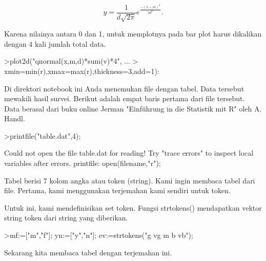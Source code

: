\documentclass{article}
\begin{document}
\begin{eulernotebook}
\begin{eulercomment}
\begin{eulercomment}
\begin{eulercomment}
\end{eulercomment}
\begin{eulerformula}
\[
y=\frac{1}{d\sqrt{2\pi}}e^{\frac{-(x-m)^2}{2d^2}}.
\]
\end{eulerformula}
\begin{eulercomment}
Karena nilainya antara 0 dan 1, untuk memplotnya pada bar plot harus
dikalikan dengan 4 kali jumlah total data.
\end{eulercomment}
\begin{eulerprompt}
>plot2d("qnormal(x,m,d)*sum(v)*4", ...
>  xmin=min(r),xmax=max(r),thickness=3,add=1):
\end{eulerprompt}
\begin{eulercomment}
Di direktori notebook ini Anda menemukan file dengan tabel. Data
tersebut mewakili hasil survei. Berikut adalah empat baris pertama
dari file tersebut. Data berasal dari buku online Jerman "Einführung
in die Statistik mit R" oleh A. Handl.
\end{eulercomment}
\begin{eulerprompt}
>printfile("table.dat",4);
\end{eulerprompt}
\begin{euleroutput}
  Could not open the file
  table.dat
  for reading!
  Try "trace errors" to inspect local variables after errors.
  printfile:
      open(filename,"r");
\end{euleroutput}
\begin{eulercomment}
Tabel berisi 7 kolom angka atau token (string). Kami ingin membaca
tabel dari file. Pertama, kami menggunakan terjemahan kami sendiri
untuk token.

Untuk ini, kami mendefinisikan set token. Fungsi strtokens()
mendapatkan vektor string token dari string yang diberikan.
\end{eulercomment}
\begin{eulerprompt}
>mf:=["m","f"]; yn:=["y","n"]; ev:=strtokens("g vg m b vb");
\end{eulerprompt}
\begin{eulercomment}
Sekarang kita membaca tabel dengan terjemahan ini.


\end{eulercomment}
\end{eulercomment}
\end{eulercomment}
\end{eulernotebook}
\end{document}

